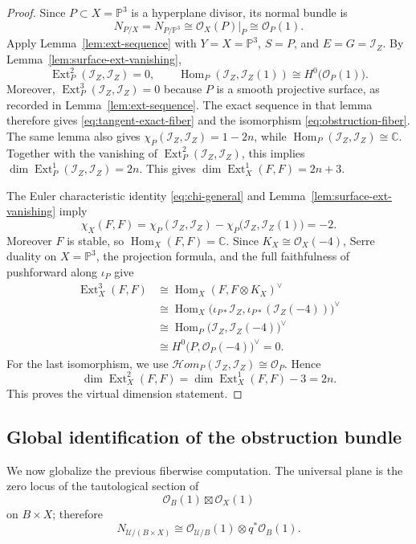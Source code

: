 \documentclass[12pt]{amsart}
\numberwithin{equation}{section}
\newcommand{\PP}{\mathbb{P}}
\newcommand{\C}{\mathbb{C}}
\newcommand{\OO}{\mathcal{O}}
\newcommand{\I}{\mathcal{I}}
\newcommand{\Ext}{\operatorname{Ext}}
\newcommand{\Hom}{\operatorname{Hom}}
\newcommand{\dual}{\vee}
\theoremstyle{plain}
\theoremstyle{definition}
\theoremstyle{remark}
\begin{document}
\begin{proof}
Since $P\subset X=\PP^3$ is a hyperplane divisor, its normal bundle is
\[
N_{P/X}=N_{P/\PP^3}\cong \OO_X(P)|_P\cong\OO_P(1).
\]
Apply Lemma~\ref{lem:ext-sequence} with $Y=X=\PP^3$, $S=P$, and $E=G=\I_Z$.
By Lemma~\ref{lem:surface-ext-vanishing},
\[
\Ext^2_P(\I_Z,\I_Z)=0,
\qquad
\Hom_P(\I_Z,\I_Z(1))\cong H^0\bigl(\OO_P(1)\bigr).
\]
Moreover, $\Ext^3_P(\I_Z,\I_Z)=0$ because $P$ is a smooth projective surface, as recorded in Lemma~\ref{lem:ext-sequence}.
The exact sequence in that lemma therefore gives \eqref{eq:tangent-exact-fiber} and the isomorphism \eqref{eq:obstruction-fiber}.
The same lemma also gives $\chi_P(\I_Z,\I_Z)=1-2n$, while $\Hom_P(\I_Z,\I_Z)\cong\C$.
Together with the vanishing of $\Ext^2_P(\I_Z,\I_Z)$, this implies $\dim\Ext^1_P(\I_Z,\I_Z)=2n$.
This gives $\dim\Ext^1_X(F,F)=2n+3$.

The Euler characteristic identity \eqref{eq:chi-general} and Lemma~\ref{lem:surface-ext-vanishing} imply
\[
\chi_X(F,F)=\chi_P(\I_Z,\I_Z)-\chi_P\bigl(\I_Z,\I_Z(1)\bigr)=-2.
\]
Moreover $F$ is stable, so $\Hom_X(F,F)=\C$.
Since $K_X\cong\OO_X(-4)$, Serre duality on $X=\PP^3$, the projection formula, and the full faithfulness of pushforward along $\iota_P$ give
\[
\begin{aligned}
\Ext^3_X(F,F)
&\cong \Hom_X(F,F\otimes K_X)^\dual \\
&\cong \Hom_X\bigl(\iota_{P*}\I_Z,\iota_{P*}(\I_Z(-4))\bigr)^\dual \\
&\cong \Hom_P\bigl(\I_Z,\I_Z(-4)\bigr)^\dual \\
&\cong H^0\bigl(P,\OO_P(-4)\bigr)^\dual=0.
\end{aligned}
\]
For the last isomorphism, we use $\mathcal Hom_P(\I_Z,\I_Z)\cong\OO_P$.
Hence
\[
\dim \Ext^2_X(F,F)=\dim\Ext^1_X(F,F)-3=2n.
\]
This proves the virtual dimension statement.
\end{proof}

\subsection{Global identification of the obstruction bundle}
We now globalize the previous fiberwise computation.
The universal plane is the zero locus of the tautological section of
\[
\OO_B(1)\boxtimes \OO_X(1)
\]
on $B\times X$; therefore
\begin{equation}\label{eq:normal-bundle}
N_{\mathcal U/(B\times X)}\cong \OO_{\mathcal U/B}(1)\otimes q^*\OO_B(1).
\end{equation}
\end{document}
